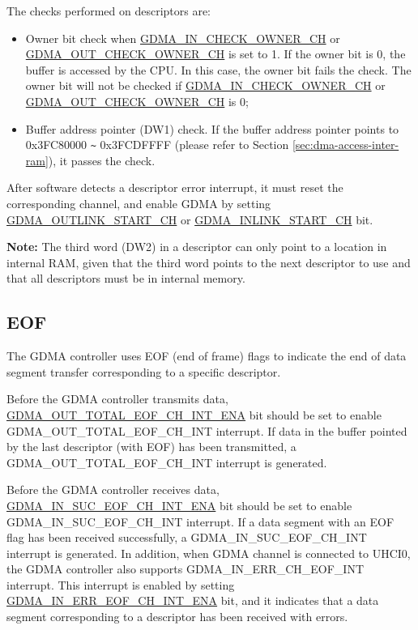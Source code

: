 \documentclass[main\_\_EN.tex]{subfiles}
\begin{document}
The checks performed on descriptors are:
\begin{itemize}
    \item Owner bit check when \hyperref[fielddesc:GDMAINCHECKOWNERCHN]{GDMA\_IN\_CHECK\_OWNER\_CH} or \hyperref[fielddesc:GDMAOUTCHECKOWNERCHN]{GDMA\_OUT\_CHECK\_OWNER\_CH} is set to 1. If the owner bit is 0, the buffer is accessed by the CPU. In this case, the owner bit fails the check. The owner bit will not be checked if \hyperref[fielddesc:GDMAINCHECKOWNERCHN]{GDMA\_IN\_CHECK\_OWNER\_CH} or \hyperref[fielddesc:GDMAOUTCHECKOWNERCHN]{GDMA\_OUT\_CHECK\_OWNER\_CH} is 0;
    \item Buffer address pointer (DW1) check. If the buffer address pointer points to 0x3FC80000 \verb+~+ 0x3FCDFFFF (please refer to Section \ref{sec:dma-access-inter-ram}), it passes the check.
\end{itemize}

After software detects a descriptor error interrupt, it must reset the corresponding channel, and enable GDMA by setting \hyperref[fielddesc:GDMAOUTLINKSTARTCHN]{GDMA\_OUTLINK\_START\_CH} or \hyperref[fielddesc:GDMAINLINKSTARTCHN]{GDMA\_INLINK\_START\_CH} bit.

{\bfseries Note:} The third word (DW2) in a descriptor can only point to a location in internal RAM, given that the third word points to the next descriptor to use and that all descriptors must be in internal memory.

\subsection{EOF}

The GDMA controller uses EOF (end of frame) flags to indicate the end of data segment transfer corresponding to a specific descriptor.

Before the GDMA controller transmits data, \hyperref[fielddesc:GDMAOUTTOTALEOFCHNINTENA]{GDMA\_OUT\_TOTAL\_EOF\_CH\_INT\_ENA} bit should be set to enable GDMA\_OUT\_TOTAL\_EOF\_CH\_INT interrupt. If data in the buffer pointed by the last descriptor (with EOF) has been transmitted, a GDMA\_OUT\_TOTAL\_EOF\_CH\_INT interrupt is generated.

Before the GDMA controller receives data, \hyperref[fielddesc:GDMAINSUCEOFCHNINTENA]{GDMA\_IN\_SUC\_EOF\_CH\_INT\_ENA} bit should be set to enable GDMA\_IN\_SUC\_EOF\_CH\_INT interrupt. If a data segment with an EOF flag has been received successfully, a GDMA\_IN\_SUC\_EOF\_CH\_INT interrupt is generated. In addition, when GDMA channel is connected to UHCI0, the GDMA controller also supports GDMA\_IN\_ERR\_CH\_EOF\_INT interrupt. This interrupt is enabled by setting \hyperref[fielddesc:GDMAINERREOFCHNINTENA]{GDMA\_IN\_ERR\_EOF\_CH\_INT\_ENA} bit, and it indicates that a data segment corresponding to a descriptor has been received with errors. 
\end{document}
